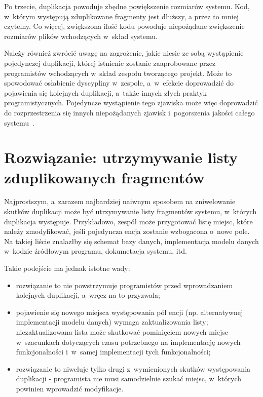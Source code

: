 Po trzecie, duplikacja powoduje zbędne powiększenie rozmiarów systemu.
Kod, w~którym występują zduplikowane fragmenty jest dłuższy, a przez to mniej czytelny.
Co więcej, zwiększona ilość kodu powoduje niepożądane zwiększenie rozmiarów plików wchodzących w~skład systemu.

Należy również zwrócić uwagę na zagrożenie, jakie niesie ze sobą wystąpienie pojedynczej duplikacji, której istnienie zostanie zaaprobowane przez programistów wchodzących w~skład zespołu tworzącego projekt.
Może to spowodować osłabienie dyscypliny w~zespole, a~w~efekcie doprowadzić do pojawienia się kolejnych duplikacji, a~także innych złych praktyk programistycznych.
Pojedyncze wystąpienie tego zjawiska może więc doprowadzić do rozprzestrzenia się innych niepożądanych zjawisk i~pogorszenia jakości całego systemu~\cite{prag_prog:entropy}.



\section{Rozwiązanie: utrzymywanie listy zduplikowanych fragmentów}

Najprostszym, a~zarazem najbardziej naiwnym sposobem na zniwelowanie skutków duplikacji może być utrzymywanie listy fragmentów systemu, w~których duplikacja występuje.
Przykładowo, zespół może przygotować listę miejsc, które należy zmodyfikować, jeśli pojedyncza encja zostanie wzbogacona o~nowe pole.
Na takiej liście znalazłby się schemat bazy danych, implementacja modelu danych w~kodzie źródłowym programu, dokumetacja systemu, itd.

Takie podejście ma jednak istotne wady:

\begin{itemize}
 \item rozwiązanie to nie powstrzymuje programistów przed wprowadzaniem kolejnych duplikacji, a~wręcz na to przyzwala;
 \item pojawienie się nowego miejsca występowania pól encji (np. alternatywnej implementacji modelu danych) wymaga zaktualizowania listy; niezaktualizowana lista może skutkować pominięciem nowych miejsc w~szacunkach dotyczących czasu potrzebnego na implementację nowych funkcjonalności i~w~samej implementacji tych funkcjonalności;
 \item rozwiązanie to niweluje tylko drugi z~wymienionych skutków występowania duplikacji - programista nie musi samodzielnie szukać miejsc, w~których powinien wprowadzić modyfikacje.
\end{itemize}



